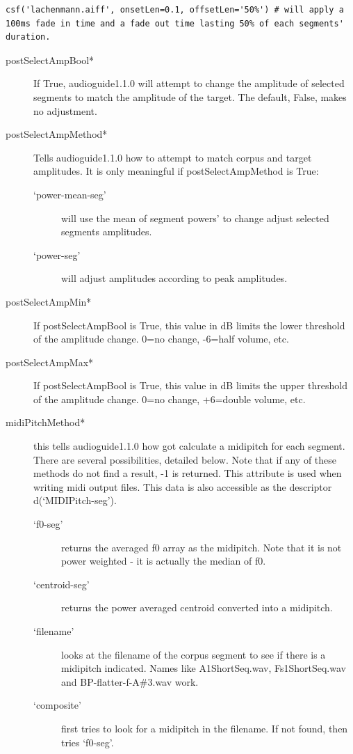 \documentclass{article}
\newcommand{\ag}{audioguide1.1.0\xspace}
\begin{document}
\begin{spacing}{1.2}
\begin{description}
\end{description}
\begin{lstlisting}
csf('lachenmann.aiff', onsetLen=0.1, offsetLen='50%') # will apply a 100ms fade in time and a fade out time lasting 50% of each segments' duration.
\end{lstlisting}
\begin{description}

\item[postSelectAmpBool*] If True, \ag will attempt to change the amplitude of selected segments to match the amplitude of the target.  The default, False, makes no adjustment.
\item[postSelectAmpMethod*] Tells \ag how to attempt to match corpus and target amplitudes.  It is only meaningful if postSelectAmpMethod is True:
\begin{description}
\item[`power-mean-seg'] will use the mean of segment powers' to change adjust selected segments amplitudes.  
\item[`power-seg'] will adjust amplitudes according to peak amplitudes.  
\end{description}
\item[postSelectAmpMin*] If postSelectAmpBool is True, this value in dB limits the lower threshold of the amplitude change.  0=no change, -6=half volume, etc.
\item[postSelectAmpMax*] If postSelectAmpBool is True, this value in dB limits the upper threshold of the amplitude change.  0=no change, +6=double volume, etc.

\item[midiPitchMethod*]\label{midipitchmethod} this tells \ag how got calculate a midipitch for each segment.  There are several possibilities, detailed below.  Note that if any of these methods do not find a result, -1 is returned.  This attribute is used when writing midi output files.  This data is also accessible as the descriptor d(`MIDIPitch-seg').
\begin{description}
\item[`f0-seg'] returns the averaged f0 array as the midipitch.  Note that it is not power weighted - it is actually the median of f0.
\item[`centroid-seg'] returns the power averaged centroid converted into a midipitch.
\item[`filename'] looks at the filename of the corpus segment to see if there is a midipitch indicated.  Names like A1ShortSeq.wav, Fs1ShortSeq.wav and BP-flatter-f-A\#3.wav work.
\item[`composite'] first tries to look for a midipitch in the filename.  If not found, then tries `f0-seg'.
\end{description}


\end{description}
\end{spacing}
\end{document}
